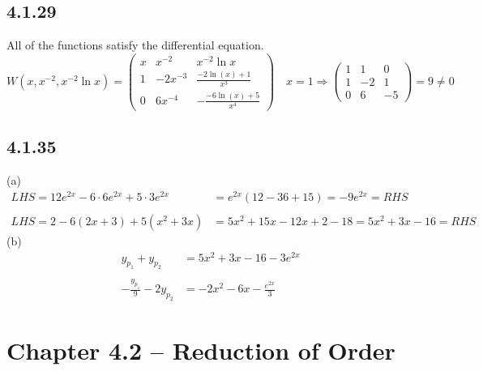 \documentclass{article}
\begin{document}
\subsection{4.1.29}
All of the functions satisfy the differential equation.
\[
    W(x,x^{-2},x^{-2}\ln x)=\begin{pmatrix}x&x^{-2}&x^{-2}\ln x\\1&-2x^{-3}&\frac{-2 \ln (x) +1}{x^3}\\0 & 6x^{-4} & -\frac{-6 \ln (x)+5}{x^4}\end{pmatrix} \quad x=1 \Rightarrow \begin{pmatrix}1&1&0\\1&-2&1\\0 & 6 & -5\end{pmatrix}=9 \neq 0
\]

\subsection{4.1.35}
(a)
\begin{align*}
    LHS=12e^{2x}-6\cdot6e^{2x}+5\cdot3e^{2x}  &= e^{2x}(12-36+15)=-9e^{2x}=RHS\\\\
    LHS=2-6(2x+3)+5(x^2+3x) &= 5x^2+15x-12x+2-18=5x^2+3x-16=RHS 
\end{align*}
(b)
\begin{align*}
    y_{p_1}+y_{p_2} &= 5x^2+3x-16-3e^{2x}\\\\
    -\frac{y_{p_1}}{9}-2y_{p_2} &= -2x^2-6x-\frac{e^{2x}}{3}
\end{align*}

    
\section{Chapter 4.2 -- Reduction of Order}
\end{document}
